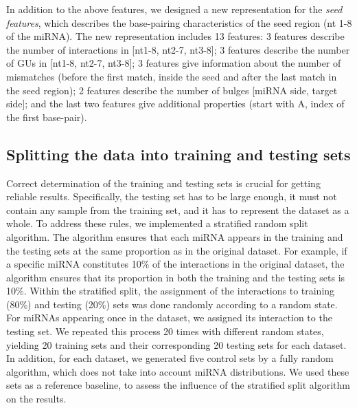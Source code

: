 \documentclass{bmcart}
\begin{document}
In addition to the above features, we designed a new representation for the \textit{seed features}, which describes the base-pairing characteristics of the seed region (nt 1-8 of the miRNA). The new representation includes 13 features: 3 features describe the number of interactions in [nt1-8, nt2-7, nt3-8]; 3 features describe the number of GUs in [nt1-8, nt2-7, nt3-8]; 3 features give information about the number of mismatches (before the first match, inside the seed and after the last match in the seed region); 2 features describe the number of bulges [miRNA side, target side]; and the last two features give additional properties (start with A, index of the first base-pair).


\subsection*{Splitting the data into training and testing sets} \label{method:split}
Correct determination of the training and testing sets is crucial for getting reliable results. Specifically, the testing set has to be large enough, it must not contain any sample from the training set, and it has to represent the dataset as a whole. 
To address these rules, we implemented a stratified random split algorithm. The algorithm ensures that each miRNA appears in the training and the testing sets at the same proportion as in the original dataset. For example, if a specific miRNA constitutes 10\% of the interactions in the original dataset, the algorithm ensures that its proportion in both the training and the testing sets is 10\%. Within the stratified split, the assignment of the interactions to training (80\%) and testing (20\%) sets was done randomly according to a random state. For miRNAs appearing once in the dataset, we assigned its interaction to the testing set.
We repeated this process 20 times with different random states, yielding 20 training sets and their corresponding 20 testing sets for each dataset. 
In addition, for each dataset, we generated five control sets by a fully random algorithm, which does not take into account miRNA distributions. We used these sets as a reference baseline, to assess the influence of the stratified split algorithm on the results.
\end{document}
